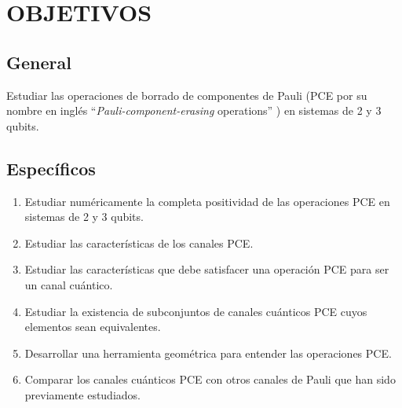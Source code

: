 \chapter{OBJETIVOS}
\section*{General}
Estudiar las operaciones de borrado de componentes de Pauli (PCE por
su nombre en inglés ``\textit{Pauli-component-erasing} operations'' 
) en sistemas de 2 y 3 qubits.


\section*{Específicos}

\begin{enumerate}
\item Estudiar numéricamente la completa positividad de las operaciones 
PCE en sistemas de 2 y 3 qubits.

\item Estudiar las características de los canales PCE.

\item Estudiar las características que debe satisfacer una operación PCE
para ser un canal cuántico.

\item Estudiar la existencia de subconjuntos de canales cuánticos PCE
cuyos elementos sean equivalentes.

\item Desarrollar una herramienta geométrica para entender las
operaciones PCE.

\item Comparar los canales cuánticos PCE con otros canales de Pauli que han 
sido previamente estudiados.
\end{enumerate}

